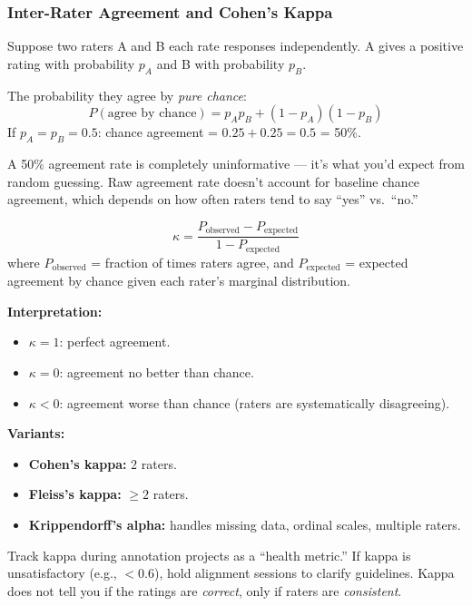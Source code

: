 \documentclass[11pt, a4paper]{article}
\begin{document}
\subsubsection{Inter-Rater Agreement and Cohen's Kappa}

\begin{mathbox}
Suppose two raters A and B each rate responses independently. A gives a positive rating with probability $p_A$ and B with probability $p_B$.

The probability they agree by \emph{pure chance}:
\[
P(\text{agree by chance}) = p_A p_B + (1-p_A)(1-p_B)
\]
If $p_A = p_B = 0.5$: chance agreement = $0.25 + 0.25 = 0.5$ = 50\%.

A 50\% agreement rate is completely uninformative --- it's what you'd expect from random guessing. Raw agreement rate doesn't account for baseline chance agreement, which depends on how often raters tend to say ``yes'' vs.\ ``no.''
\end{mathbox}

\begin{defbox}
\[
\kappa = \frac{P_{\text{observed}} - P_{\text{expected}}}{1 - P_{\text{expected}}}
\]
where $P_{\text{observed}}$ = fraction of times raters agree, and $P_{\text{expected}}$ = expected agreement by chance given each rater's marginal distribution.

\textbf{Interpretation:}
\begin{itemize}[leftmargin=1.5em]
  \item $\kappa = 1$: perfect agreement.
  \item $\kappa = 0$: agreement no better than chance.
  \item $\kappa < 0$: agreement worse than chance (raters are systematically disagreeing).
\end{itemize}

\textbf{Variants:}
\begin{itemize}[leftmargin=1.5em]
  \item \textbf{Cohen's kappa:} 2 raters.
  \item \textbf{Fleiss's kappa:} $\geq 2$ raters.
  \item \textbf{Krippendorff's alpha:} handles missing data, ordinal scales, multiple raters.
\end{itemize}
\end{defbox}

\begin{notebox}
Track kappa during annotation projects as a ``health metric.'' If kappa is unsatisfactory (e.g., $< 0.6$), hold alignment sessions to clarify guidelines. Kappa does not tell you if the ratings are \emph{correct}, only if raters are \emph{consistent}.
\end{notebox}
\end{document}
